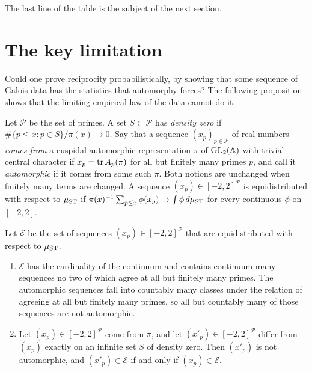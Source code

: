 The last line of the table is the subject of the next section.

\section{The key limitation}\label{sec:01limits}

Could one prove reciprocity probabilistically, by showing that some sequence of Galois data has the statistics that automorphy forces? The following proposition shows that the limiting empirical law of the data cannot do it.

Let $\mathcal P$ be the set of primes. A set $S\subset\mathcal P$ has \emph{density zero} if $\#\{p\le x:p\in S\}/\pi(x)\to0$. Say that a sequence $(x_p)_{p\in\mathcal P}$ of real numbers \emph{comes from} a cuspidal automorphic representation $\pi$ of $\mathrm{GL}_2(\mathbb{A})$ with trivial central character if $x_p=\operatorname{tr} A_p(\pi)$ for all but finitely many primes $p$, and call it \emph{automorphic} if it comes from some such $\pi$. Both notions are unchanged when finitely many terms are changed. A sequence $(x_p)\in[-2,2]^{\mathcal P}$ is equidistributed with respect to $\mu_{\mathrm{ST}}$ if $\pi(x)^{-1}\sum_{p\le x}\phi(x_p)\to\int\phi\,d\mu_{\mathrm{ST}}$ for every continuous $\phi$ on $[-2,2]$.

\begin{proposition}\label{prop:01limits}
Let $\mathcal E$ be the set of sequences $(x_p)\in[-2,2]^{\mathcal P}$ that are equidistributed with respect to $\mu_{\mathrm{ST}}$.
\begin{enumerate}
\item $\mathcal E$ has the cardinality of the continuum and contains continuum many sequences no two of which agree at all but finitely many primes. The automorphic sequences fall into countably many classes under the relation of agreeing at all but finitely many primes, so all but countably many of those sequences are not automorphic.
\item Let $(x_p)\in[-2,2]^{\mathcal P}$ come from $\pi$, and let $(x'_p)\in[-2,2]^{\mathcal P}$ differ from $(x_p)$ exactly on an infinite set $S$ of density zero. Then $(x'_p)$ is not automorphic, and $(x'_p)\in\mathcal E$ if and only if $(x_p)\in\mathcal E$.
\end{enumerate}
\end{proposition}

